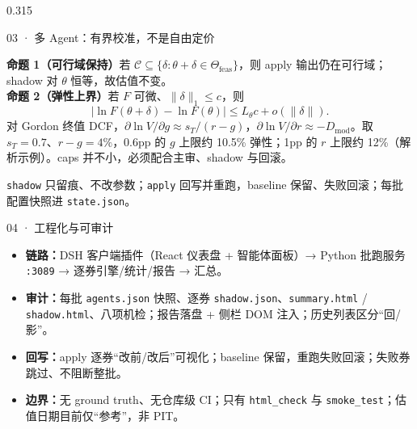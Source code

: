 \documentclass[final]{beamer}
\newcommand{\kw}[1]{\textcolor{csred}{\textbf{#1}}}
\newcommand{\muted}[1]{\textcolor{dim}{#1}}
\begin{document}
\begin{frame}[t]
\begin{columns}[t,onlytextwidth]
\begin{column}{0.315\textwidth}
\begin{block}{03 ·  多 Agent：有界校准，不是自由定价}
\vspace{3mm}
\colorbox{softblue}{\parbox{\dimexpr\linewidth-2\fboxsep}{%
\kw{命题 1（可行域保持）}若 \(\mathcal C\subseteq\{\delta:\theta+\delta\in\Theta_{\mathrm{feas}}\}\)，则 apply 输出仍在可行域；shadow 对 \(\theta\) 恒等，故估值不变。\\[1mm]
\kw{命题 2（弹性上界）}若 \(F\) 可微、\(\|\delta\|_1\le c\)，则
{\fontsize{24}{30}\selectfont
\[
\left|\ln F(\theta+\delta)-\ln F(\theta)\right|\le L_\theta c+o(\|\delta\|).
\]
}
对 Gordon 终值 DCF，\(\partial\ln V/\partial g\approx s_T/(r-g)\)，\(\partial\ln V/\partial r\approx-D_{\mathrm{mod}}\)。取 \(s_T=0.7\)、\(r-g=4\%\)，0.6pp 的 \(g\) 上限约 10.5\% 弹性；1pp 的 \(r\) 上限约 12\%（解析示例）。caps 并不小，必须配合主审、shadow 与回滚。}}

\vspace{3mm}
\muted{\footnotesize \texttt{shadow} 只留痕、不改参数；\texttt{apply} 回写并重跑，baseline 保留、失败回滚；每批配置快照进 \texttt{state.json}。}
\end{block}

\begin{block}{04 ·  工程化与可审计}
\begin{center}
\end{center}

\vspace{2mm}
\begin{itemize}
\item \kw{链路：}DSH 客户端插件（React 仪表盘 + 智能体面板）→ Python 批跑服务 \texttt{:3089} → 逐券引擎/统计/报告 → 汇总。
\item \kw{审计：}每批 \texttt{agents.json} 快照、逐券 \texttt{shadow.json}、\texttt{summary.html} / \texttt{shadow.html}、八项机检；报告落盘 + 侧栏 DOM 注入；历史列表区分“回/影”。
\item \kw{回写：}apply 逐券“改前/改后”可视化；baseline 保留，重跑失败回滚；失败券跳过、不阻断整批。
\item \kw{边界：}无 ground truth、无仓库级 CI；只有 \texttt{html\_check} 与 \texttt{smoke\_test}；估值日期目前仅“参考”，非 PIT。
\end{itemize}


\end{block}
\end{column}
\end{columns}
\end{frame}
\end{document}
